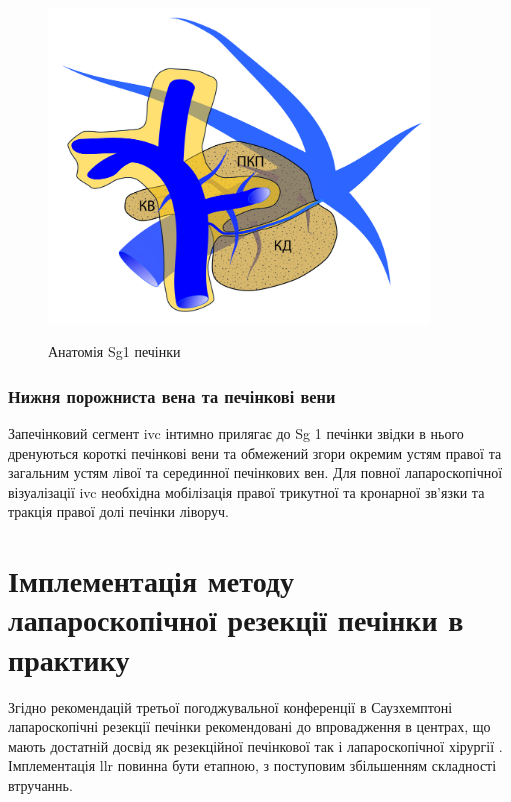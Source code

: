 \begin{refsection}
\begin{figure}[htbp]
\caption{Анатомія Sg1 печінки}
\centering
\includegraphics[width=0.9\textwidth]{Illustrations/Chapter_01/Sg1.jpg}
\label{fig:Sg1}
\end{figure}

\subsubsection{Нижня порожниста вена та печінкові вени}

Запечінковий сегмент \acrshort{ivc} інтимно прилягає до Sg 1 печінки звідки в нього дренуються короткі печінкові вени та обмежений згори окремим устям правої та загальним устям лівої та серединної печінкових вен. Для повної лапароскопічної візуалізації \acrshort{ivc} необхідна мобілізація правої трикутної та кронарної зв'язки та тракція правої долі печінки ліворуч.

\section{Імплементація методу лапароскопічної резекції печінки в практику}

Згідно рекомендацій третьої погоджувальної конференції в Саузхемптоні лапароскопічні резекції печінки рекомендовані до впровадження в центрах, що мають достатній досвід як резекційної печінкової так і лапароскопічної хірургії \cite{AbuHilal2017a}. Імплементація \acrshort{llr} повинна бути етапною, з поступовим збільшенням складності втручаннь. 


\end{refsection}
